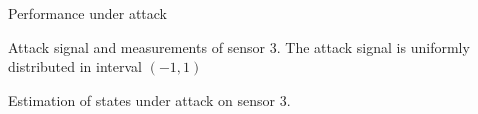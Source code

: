 \documentclass{beamer}
\begin{document}
\begin{frame}{Performance under attack}
	\vspace{-30pt}
	\begin{figure}[ht]
		\centering
		\scalebox{0.65}{}
	\end{figure}
\vspace{-10pt}
	\small Attack signal and measurements of sensor 3. The attack signal is uniformly distributed in interval $(-1,1)$
	\vspace{-10pt}
	\begin{figure}[ht]
		\centering
		\scalebox{0.65}{}
	\end{figure}
\vspace{-10pt}
	Estimation of states under attack on sensor 3.
\end{frame}
\end{document}
